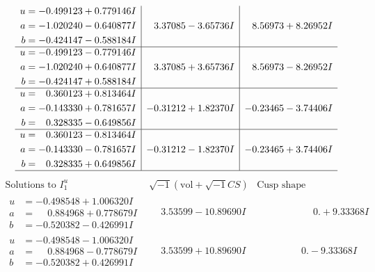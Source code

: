 \documentclass[1p]{elsarticle_modified}
\theoremstyle{definition}
\newcommand{\I}{\sqrt{-1}}
\begin{document}
$$\begin{array}{c|c|c}
\begin{aligned}
u &= -0.499123 + 0.779146 I \\
a &= -1.020240 - 0.640877 I \\
b &= -0.424147 - 0.588184 I\end{aligned}
 & \phantom{-}3.37085 - 3.65736 I & \phantom{-}8.56973 + 8.26952 I \\ \hline\begin{aligned}
u &= -0.499123 - 0.779146 I \\
a &= -1.020240 + 0.640877 I \\
b &= -0.424147 + 0.588184 I\end{aligned}
 & \phantom{-}3.37085 + 3.65736 I & \phantom{-}8.56973 - 8.26952 I \\ \hline\begin{aligned}
u &= \phantom{-}0.360123 + 0.813464 I \\
a &= -0.143330 + 0.781657 I \\
b &= \phantom{-}0.328335 - 0.649856 I\end{aligned}
 & -0.31212 + 1.82370 I & -0.23465 - 3.74406 I \\ \hline\begin{aligned}
u &= \phantom{-}0.360123 - 0.813464 I \\
a &= -0.143330 - 0.781657 I \\
b &= \phantom{-}0.328335 + 0.649856 I\end{aligned}
 & -0.31212 - 1.82370 I & -0.23465 + 3.74406 I\\
 \hline 
 \end{array}$$\newpage$$\begin{array}{c|c|c}  
\text{Solutions to }I^u_{1}& \I (\text{vol} + \sqrt{-1}CS) & \text{Cusp shape}\\
 \hline 
\begin{aligned}
u &= -0.498548 + 1.006320 I \\
a &= \phantom{-}0.884968 + 0.778679 I \\
b &= -0.520382 - 0.426991 I\end{aligned}
 & \phantom{-}3.53599 - 10.89690 I & \phantom{-0.000000 -}0. + 9.33368 I \\ \hline\begin{aligned}
u &= -0.498548 - 1.006320 I \\
a &= \phantom{-}0.884968 - 0.778679 I \\
b &= -0.520382 + 0.426991 I\end{aligned}
 & \phantom{-}3.53599 + 10.89690 I & \phantom{-0.000000 } 0. - 9.33368 I \\ \hline\begin{aligned}

\end{aligned}
\end{array}$$
\end{document}
